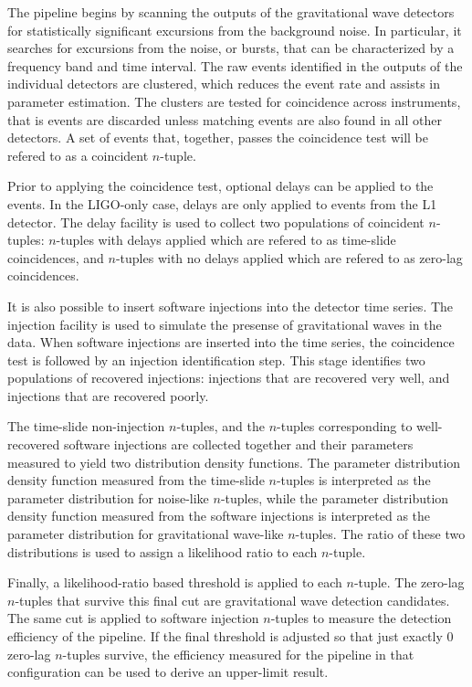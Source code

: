 \documentclass[10pt]{article}
\begin{document}
The pipeline begins by scanning the outputs of the gravitational wave
detectors for statistically significant excursions from the background
noise.  In particular, it searches for excursions from the noise, or
bursts, that can be characterized by a frequency band and time interval.
The raw events identified in the outputs of the individual detectors are
clustered, which reduces the event rate and assists in parameter
estimation.  The clusters are tested for coincidence across instruments,
that is events are discarded unless matching events are also found in all
other detectors.  A set of events that, together, passes the coincidence
test will be refered to as a coincident \(n\)-tuple.

Prior to applying the coincidence test, optional delays can be applied to
the events.  In the LIGO-only case, delays are only applied to events from
the L1 detector.  The delay facility is used to collect two populations of
coincident \(n\)-tuples:  \(n\)-tuples with delays applied which are
refered to as time-slide coincidences, and \(n\)-tuples with no delays
applied which are refered to as zero-lag coincidences.

It is also possible to insert software injections into the detector time
series.  The injection facility is used to simulate the presense of
gravitational waves in the data.  When software injections are inserted
into the time series, the coincidence test is followed by an injection
identification step.  This stage identifies two populations of recovered
injections:  injections that are recovered very well, and injections that
are recovered poorly.

The time-slide non-injection \(n\)-tuples, and the \(n\)-tuples
corresponding to well-recovered software injections are collected together
and their parameters measured to yield two distribution density functions.
The parameter distribution density function measured from the time-slide
\(n\)-tuples is interpreted as the parameter distribution for noise-like
\(n\)-tuples, while the parameter distribution density function measured
from the software injections is interpreted as the parameter distribution
for gravitational wave-like \(n\)-tuples.  The ratio of these two
distributions is used to assign a likelihood ratio to each \(n\)-tuple.

Finally, a likelihood-ratio based threshold is applied to each \(n\)-tuple.
The zero-lag \(n\)-tuples that survive this final cut are gravitational
wave detection candidates.  The same cut is applied to software injection
\(n\)-tuples to measure the detection efficiency of the pipeline.  If the
final threshold is adjusted so that just exactly 0 zero-lag \(n\)-tuples
survive, the efficiency measured for the pipeline in that configuration can
be used to derive an upper-limit result.
\end{document}

